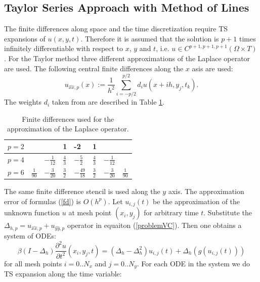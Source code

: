 \documentclass[%
 aip,
cp,  %
 amsmath,amssymb,%
 reprint,%
]{revtex4-2}
\newcommand{\be}{\begin{equation}}
\newcommand{\ee}{\end{equation}}
\newcommand{\rf}[1]{(\ref{#1})}
\begin{document}
\subsection{ Taylor Series Approach with Method of Lines }
The finite differences along space and the time discretization require TS expansions of $u(x,y,t)$. Therefore it is assumed that the solution is $p+1$ times infinitely differentiable with respect to $x$, $y$ and $t$, i.e. $u \in C^{p+1,p+1,p+1}(\Omega \times T)$.
For the Taylor method three different approximations of the Laplace operator are used. The following central finite differences along the $x$ asis are used:
\begin{equation}\label{fd}
u_{\widehat{xx},p}(x) :=  \frac{1}{h^2} \sum\limits_{i=-p/2}^{p/2} d_i u(x+ih, y_j, t_k).
\end{equation}
The weights $d_i$ taken from  \cite{forn} are described in Table \ref{table:A00}. 
\begin{table}[ht]
\centering
\small
		\begin{tabular}{||c|l|l|l|l|l|l|l||}
			\hline
			\hline
            $p=2$          &          &                                 &     1      &   -2   &    1    &    &        \\
   			\hline 
			\hline 
           $p=4$          &                            &   $-\frac{1}{12}$     &     $\frac{4}{3}$      &   $-\frac{5}{2} $     &    $\frac{4}{3}$    &  $-\frac{1}{12}$   &        \\
	   \hline
			\hline 
            $p=6$        &   $\frac{1}{90}$       &     $-\frac{3}{20}$     &    $\frac{3}{2}$      &    $-\frac{49}{18}$   &    $\frac{3}{2}$    & $-\frac{3}{20}$    &    $\frac{1}{90}$       \\
	   \hline
			\hline 
		\end{tabular}
	\caption{ Finite differences used for the approximation of the Laplace operator.}
	\label{table:A00}
\end{table}
The same finite difference stencil is used along the $y$ axis. The approximation error of  formulas \rf{fd} is $O(h^p)$. Let $u_{i,j}(t)$ be the approximation of the unknown function $u$ at mesh point $(x_i, y_j)$ for arbitrary time $t$. Substitute the $\Delta_{h,p} = u_{\widehat{xx},p} + u_{\widehat{yy},p}$ operator in equaiton \rf{problemVC}. Then one obtains a system of ODEs:
\be \label{DiscreteEq}
\beta (I-\Delta_h) \frac{\partial^2 u}{\partial t^2}(x_i, y_j, t)=
 (\Delta_h - \Delta_h^2) u_{i, j}(t) + \Delta_h ( g( u_{i, j}(t) ) )
\ee
for all mesh points $i = 0..N_x$ and $j=0..N_y$. For each ODE in the system we do TS expansion along the time variable:
\end{document}
